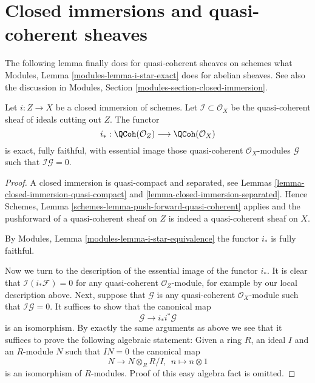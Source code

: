 \section{Closed immersions and quasi-coherent sheaves}
\label{section-closed-immersions-quasi-coherent}

\noindent
The following lemma finally does for quasi-coherent sheaves on schemes
what Modules, Lemma \ref{modules-lemma-i-star-exact} does for abelian sheaves.
See also the discussion in
Modules, Section \ref{modules-section-closed-immersion}.

\begin{lemma}
\label{lemma-i-star-equivalence}
Let $i : Z \to X$ be a closed immersion of schemes. Let
$\mathcal{I} \subset \mathcal{O}_X$ be the quasi-coherent sheaf of ideals
cutting out $Z$. The functor
$$
i_* :
\QCoh(\mathcal{O}_Z)
\longrightarrow
\QCoh(\mathcal{O}_X)
$$
is exact, fully faithful, with essential image those quasi-coherent
$\mathcal{O}_X$-modules $\mathcal{G}$ such that $\mathcal{I}\mathcal{G} = 0$.
\end{lemma}

\begin{proof}
A closed immersion is quasi-compact and separated, see
Lemmas \ref{lemma-closed-immersion-quasi-compact} and
\ref{lemma-closed-immersion-separated}. Hence
Schemes, Lemma \ref{schemes-lemma-push-forward-quasi-coherent}
applies and the pushforward of a quasi-coherent
sheaf on $Z$ is indeed a quasi-coherent sheaf on $X$.

\medskip\noindent
By Modules, Lemma \ref{modules-lemma-i-star-equivalence}
the functor $i_*$ is fully faithful.

\medskip\noindent
Now we turn to the description of the essential image of the
functor $i_*$. It is clear that $\mathcal{I}(i_*\mathcal{F}) = 0$
for any quasi-coherent $\mathcal{O}_Z$-module, for example
by our local description above. Next, suppose that $\mathcal{G}$
is any quasi-coherent $\mathcal{O}_X$-module such that
$\mathcal{I}\mathcal{G} = 0$. It suffices to show that the canonical map
$$
\mathcal{G} \longrightarrow i_* i^*\mathcal{G}
$$
is an isomorphism. By exactly the same arguments as above we see that
it suffices to prove the following algebraic statement: Given a ring
$R$, an ideal $I$ and an $R$-module $N$ such that $IN = 0$ the canonical map
$$
N \longrightarrow N \otimes_R R/I, \ \
n \longmapsto n \otimes 1
$$
is an isomorphism of $R$-modules. Proof of this easy algebra fact is omitted.
\end{proof}

